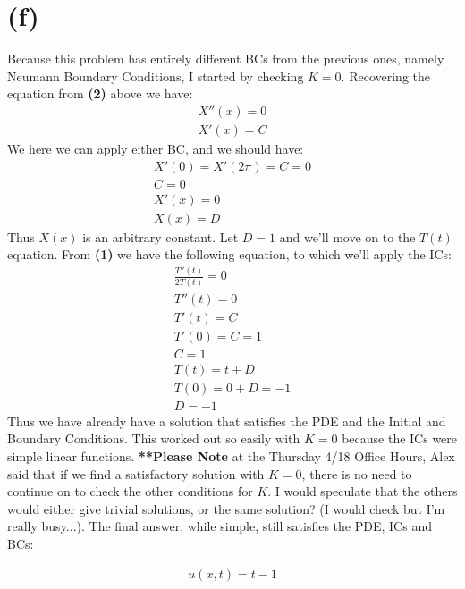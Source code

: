 \documentclass{article}
\begin{document}
\section*{\textbf{(f)}}
Because this problem has entirely different BCs from the previous ones, namely Neumann Boundary Conditions, I started by checking $K=0$. Recovering the equation from \textbf{(2)} above we have:
\begin{equation}
\begin{aligned}
X''(x) = 0\\
X'(x) = C
\end{aligned}
\end{equation}
We here we can apply either BC, and we should have:
\begin{equation}
\begin{aligned}
X'(0) = X'(2\pi) = C = 0\\
C = 0\\
X'(x) = 0\\
X(x) = D
\end{aligned}
\end{equation}
Thus $X(x)$ is an arbitrary constant. Let $D=1$ and we'll move on to the $T(t)$ equation. From \textbf{(1)} we have the following equation, to which we'll apply the ICs:
\begin{equation}
\begin{aligned}
\frac{T''(t)}{2T(t)} = 0\\
T''(t) = 0\\
T'(t) = C\\
T'(0) = C = 1\\
C = 1\\
T(t) = t + D\\
T(0) = 0 + D = -1\\
D = -1
\end{aligned}
\end{equation}
Thus we have already have a solution that satisfies the PDE and the Initial and Boundary Conditions. This worked out so easily with $K=0$ because the ICs were simple linear functions. \textbf{**Please Note} at the Thursday 4/18 Office Hours, Alex said that if we find a satisfactory solution with $K=0$, there is no need to continue on to check the other conditions for $K$. I would speculate that the others would either give trivial solutions, or the same solution? (I would check but I'm really busy...). The final answer, while simple, still satisfies the PDE, ICs and BCs:
\begin{tcolorbox}[minipage,colback=white,arc=0pt,outer arc=0pt]
\begin{equation}
\begin{aligned}
u(x,t) = t - 1
\end{aligned}
\end{equation}
\end{tcolorbox}
\end{document}
